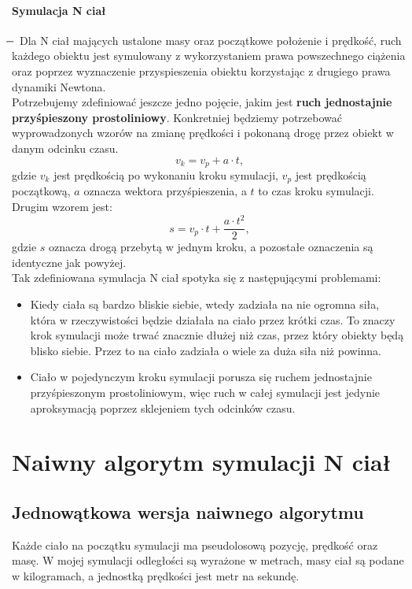 \documentclass[14pt,twoside,a4paper]{article}
\theoremstyle{definition}
\begin{document}
\paragraph{Symulacja N ciał} 
\newcommand{\mi}{\boldsymbol{} \mathrel{\mkern -16mu} \boldsymbol{-}}
$\mi$
Dla N ciał mających ustalone masy oraz początkowe położenie i prędkość, ruch każdego obiektu jest symulowany z wykorzystaniem prawa powszechnego ciążenia oraz poprzez wyznaczenie przyspieszenia obiektu korzystając z drugiego prawa dynamiki Newtona.\\
\bigskip
Potrzebujemy zdefiniować jeszcze jedno pojęcie, jakim jest \textbf{ruch jednostajnie przyśpieszony prostoliniowy}.
Konkretniej będziemy potrzebować wyprowadzonych wzorów na zmianę prędkości i pokonaną drogę przez obiekt w danym odcinku czasu.
$$v_k = v_p + a\cdot t,$$ gdzie $v_k$ jest prędkością po wykonaniu kroku symulacji, $v_p$ jest prędkością początkową, $a$ oznacza wektora przyśpieszenia, a $t$ to czas kroku symulacji.\\
Drugim wzorem jest:
$$s = v_p\cdot t + \frac{a\cdot t^2}{2},$$ gdzie $s$ oznacza drogą przebytą w jednym kroku, a pozostałe oznaczenia są identyczne jak powyżej.\\
\newpage
Tak zdefiniowana symulacja N ciał spotyka się z następującymi problemami:
\begin{itemize}
\item Kiedy ciała są bardzo bliskie siebie, wtedy zadziała na nie ogromna siła, która w rzeczywistości będzie działała na ciało przez krótki czas. To znaczy krok symulacji może trwać znacznie dłużej niż czas, przez który obiekty będą blisko siebie. Przez to na ciało zadziała o wiele za duża siła niż powinna.
\item Ciało w pojedynczym kroku symulacji porusza się ruchem jednostajnie przyśpieszonym prostoliniowym, więc ruch w całej symulacji jest jedynie aproksymacją poprzez sklejeniem tych odcinków czasu.
\end{itemize}

\section{\LARGE Naiwny algorytm symulacji N ciał}
\bigskip

\subsection{\Large Jednowątkowa wersja naiwnego algorytmu}

Każde ciało na początku symulacji ma pseudolosową pozycję, prędkość oraz masę. W mojej symulacji odległości są wyrażone w metrach, masy ciał są podane w kilogramach, a jednostką prędkości jest metr na sekundę. \\
\end{document}
